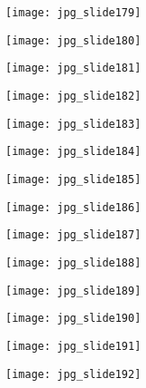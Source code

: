 \documentclass[main.tex]{subfiles}
\begin{document}
\begin{center}
\texttt{[image: jpg\_slide179]}
\end{center}

\begin{center}
\texttt{[image: jpg\_slide180]}
\end{center}

\begin{center}
\texttt{[image: jpg\_slide181]}
\end{center}

\begin{center}
\texttt{[image: jpg\_slide182]}
\end{center}

\begin{center}
\texttt{[image: jpg\_slide183]}
\end{center}

\begin{center}
\texttt{[image: jpg\_slide184]}
\end{center}

\begin{center}
\texttt{[image: jpg\_slide185]}
\end{center}

\begin{center}
\texttt{[image: jpg\_slide186]}
\end{center}

\begin{center}
\texttt{[image: jpg\_slide187]}
\end{center}

\begin{center}
\texttt{[image: jpg\_slide188]}
\end{center}

\begin{center}
\texttt{[image: jpg\_slide189]}
\end{center}

\begin{center}
\texttt{[image: jpg\_slide190]}
\end{center}

\begin{center}
\texttt{[image: jpg\_slide191]}
\end{center}

\begin{center}
\texttt{[image: jpg\_slide192]}
\end{center}
\end{document}
